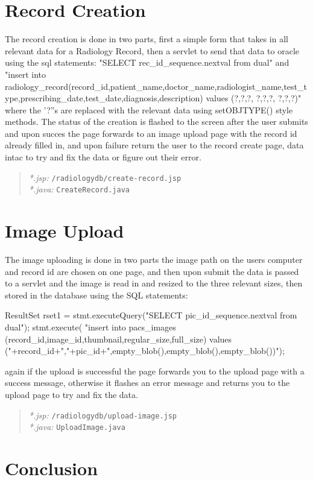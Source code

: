 \documentclass[11pt]{report}
\begin{document}
\section*{Record Creation}
The record creation is done in two parts, first a simple form that takes in all relevant data for a Radiology Record, then a servlet to send that data to oracle using the sql statements: "SELECT rec_id_sequence.nextval from dual" and  "insert into radiology_record(record_id,patient_name,doctor_name,radiologist_name,test_type,prescribing_date,test_date,diagnosis,description) values (?,?,?, ?,?,?, ?,?,?)" where the '?''s are replaced with the relevant data using setOBJTYPE() style methods.
The status of the creation is flashed to the screen after the user submits and upon succes the page forwards to an image upload page with the record id already filled in, and upon failure return the user to the record create page, data intac to try and fix the data or figure out their error.  

\begin{quote}
\emph{*.jsp:} \texttt{/radiologydb/create-record.jsp} \\
\emph{*.java: } \texttt{CreateRecord.java}
\end{quote}



\section*{Image Upload}
The image uploading is done in two parts the image path on the users computer and record id are chosen on one page, and then upon submit the data is passed to a servlet and the image is read in and resized to the three relevant sizes, then stored in the database using the SQL statements:

	    ResultSet rset1 = stmt.executeQuery("SELECT pic_id_sequence.nextval from dual");
	    stmt.execute( "insert into pacs_images (record_id,image_id,thumbnail,regular_size,full_size) values ("+record_id+","+pic_id+",empty_blob(),empty_blob(),empty_blob())");

again if the upload is successful the page forwards you to the upload page with a success message, otherwise it flashes an error message and returns you to the upload page to try and fix the data.

\begin{quote}
\emph{*.jsp:} \texttt{/radiologydb/upload-image.jsp} \\
\emph{*.java: } \texttt{UploadImage.java}
\end{quote}

\section*{Conclusion}
\end{document}
